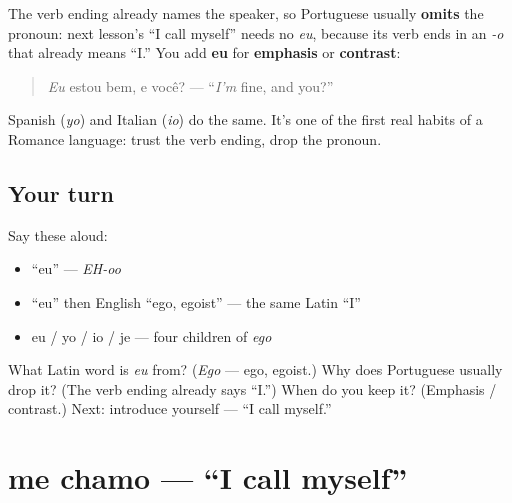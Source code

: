 \begin{grammarlens}[title={Grammar Lens: the dropped subject (pro-drop)}]
The verb ending already names the speaker, so Portuguese usually \textbf{omits} the pronoun: next lesson's \textquotedblleft{}I call myself\textquotedblright{} needs no \emph{eu}, because its verb ends in an \emph{-o} that already means \textquotedblleft{}I.\textquotedblright{} You add \textbf{eu} for \textbf{emphasis} or \textbf{contrast}:

\begin{quote}
\emph{Eu} estou bem, e você? — \textquotedblleft{}\emph{I'm} fine, and you?\textquotedblright{}
\end{quote}

Spanish (\emph{yo}) and Italian (\emph{io}) do the same. It's one of the first real habits of a Romance language: trust the verb ending, drop the pronoun.
\end{grammarlens}

\subsection*{Your turn}
Say these aloud:

\begin{itemize}
\raggedright
  \item \textquotedblleft{}eu\textquotedblright{} — \emph{EH-oo}
  \item \textquotedblleft{}eu\textquotedblright{} then English \textquotedblleft{}ego, egoist\textquotedblright{} — the same Latin \textquotedblleft{}I\textquotedblright{}
  \item eu / yo / io / je — four children of \emph{ego}
\end{itemize}

\begin{tcolorbox}[breakable,colback=teal!4,colframe=teal!35!black,title={Before you move on}]
What Latin word is \emph{eu} from? (\emph{Ego} — ego, egoist.) Why does Portuguese usually drop it? (The verb ending already says \textquotedblleft{}I.\textquotedblright{}) When do you keep it? (Emphasis / contrast.) Next: introduce yourself — \textquotedblleft{}I call myself.\textquotedblright{}
\end{tcolorbox}
\section[me chamo / chamo-me]{me chamo — \textquotedblleft{}I call myself\textquotedblright{}}

\label{lesson:PT-C03-me-chamo}



